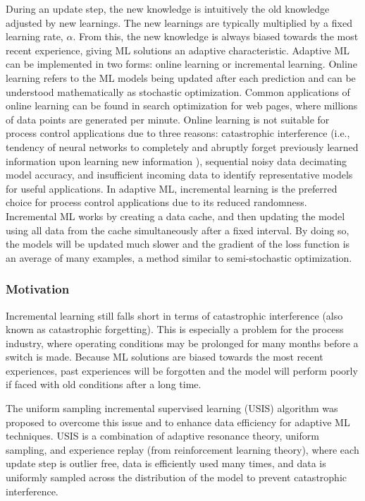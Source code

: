 During an update step, the new knowledge is intuitively the old knowledge adjusted by new learnings.  The new learnings are typically multiplied by a fixed learning rate, $\alpha$. From this, the new knowledge is always biased towards the most recent experience, giving ML solutions an adaptive characteristic.  Adaptive ML can be implemented in two forms: online learning or incremental learning. Online learning refers to the ML models being updated after each prediction and can be understood mathematically as stochastic optimization. Common applications of online learning can be found in search optimization for web pages, where millions of data points are generated per minute. Online learning is not suitable for process control applications due to three reasons: catastrophic interference (i.e., tendency of neural networks to completely and abruptly forget previously learned information upon learning new information \cite{cat_int}), sequential noisy data decimating model accuracy, and insufficient incoming data to identify representative models for useful applications.  In adaptive ML, incremental learning is the preferred choice for process control applications due to its reduced randomness.  Incremental ML works by creating a data cache, and then updating the model using all data from the cache simultaneously after a fixed interval.  By doing so, the models will be updated much slower and the gradient of the loss function is an average of many examples, a method similar to semi-stochastic optimization.

\subsubsection{Motivation}
Incremental learning still falls short in terms of catastrophic interference (also known as catastrophic forgetting). This is especially a problem for the process industry, where operating conditions may be prolonged for many months before a switch is made. Because ML solutions are biased towards the most recent experiences, past experiences will be forgotten and the model will perform poorly if faced with old conditions after a long time. 

The uniform sampling incremental supervised learning (USIS) algorithm was proposed to overcome this issue and to enhance data efficiency for adaptive ML techniques.  USIS is a combination of adaptive resonance theory, uniform sampling, and experience replay (from reinforcement learning theory), where each update step is outlier free, data is efficiently used many times, and data is uniformly sampled across the distribution of the model to prevent catastrophic interference.

